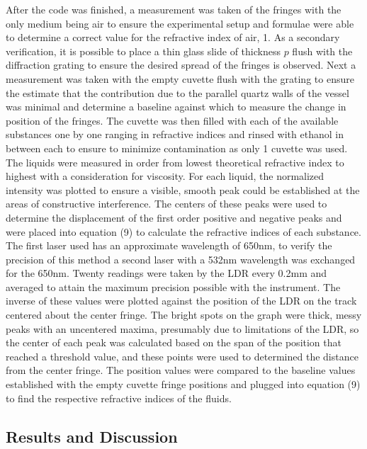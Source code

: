 \documentclass[11pt]{article}
\begin{document}
    After the code was finished, a measurement was taken of the fringes with
the only medium being air to ensure the experimental setup and formulae
were able to determine a correct value for the refractive index of air,
1. As a secondary verification, it is possible to place a thin glass
slide of thickness \(p\) flush with the diffraction grating to ensure
the desired spread of the fringes is observed. Next a measurement was
taken with the empty cuvette flush with the grating to ensure the
estimate that the contribution due to the parallel quartz walls of the
vessel was minimal and determine a baseline against which to measure the
change in position of the fringes. The cuvette was then filled with each
of the available substances one by one ranging in refractive indices and
rinsed with ethanol in between each to ensure to minimize contamination
as only 1 cuvette was used. The liquids were measured in order from
lowest theoretical refractive index to highest with a consideration for
viscosity. For each liquid, the normalized intensity was plotted to
ensure a visible, smooth peak could be established at the areas of
constructive interference. The centers of these peaks were used to
determine the displacement of the first order positive and negative
peaks and were placed into equation (9) to calculate the refractive
indices of each substance. The first laser used has an approximate
wavelength of 650nm, to verify the precision of this method a second
laser with a 532nm wavelength was exchanged for the 650nm. Twenty
readings were taken by the LDR every 0.2mm and averaged to attain the
maximum precision possible with the instrument. The inverse of these
values were plotted against the position of the LDR on the track
centered about the center fringe. The bright spots on the graph were
thick, messy peaks with an uncentered maxima, presumably due to
limitations of the LDR, so the center of each peak was calculated based
on the span of the position that reached a threshold value, and these
points were used to determined the distance from the center fringe. The
position values were compared to the baseline values established with
the empty cuvette fringe positions and plugged into equation (9) to find
the respective refractive indices of the fluids.

    \hypertarget{results-and-discussion}{%
\subsection{Results and Discussion}\label{results-and-discussion}}
\end{document}
